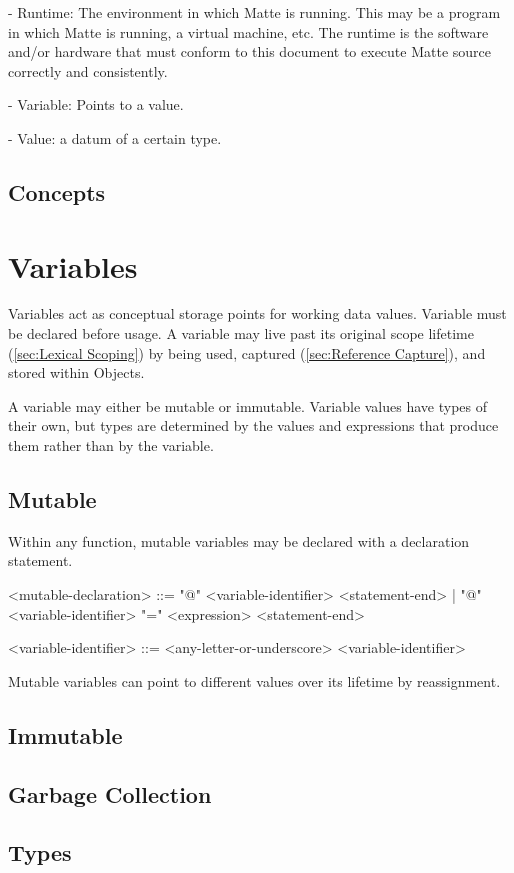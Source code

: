 \documentclass[12pt,letterpaper]{report}
\begin{document}
- Runtime: The environment in which Matte is running. This may be a program in which Matte is running, a virtual machine, etc. The runtime is the software and/or hardware that must conform to this document to execute Matte source correctly and consistently.

- Variable: Points to a value.

- Value: a datum of a certain type.


\section{Concepts}
\chapter{Variables}

Variables act as conceptual storage points for working data values. Variable must be declared before usage.
A variable may live past its original scope lifetime (\autoref{sec:Lexical Scoping}) by being used, captured (\autoref{sec:Reference Capture}), and stored within Objects.

A variable may either be mutable or immutable. Variable values have types of their own, but 
types are determined by the values and expressions that produce them rather than by the 
variable.

\section{Mutable}

Within any function, mutable variables may be declared with a declaration statement.

    <mutable-declaration> ::= "@" <variable-identifier> <statement-end> | "@" <variable-identifier> "=" <expression> <statement-end> 

    <variable-identifier> ::= <any-letter-or-underscore> <variable-identifier>
        

Mutable variables can point to different values over its lifetime by reassignment.

\section{Immutable}
\section{Garbage Collection}
\section{Types}
\end{document}
